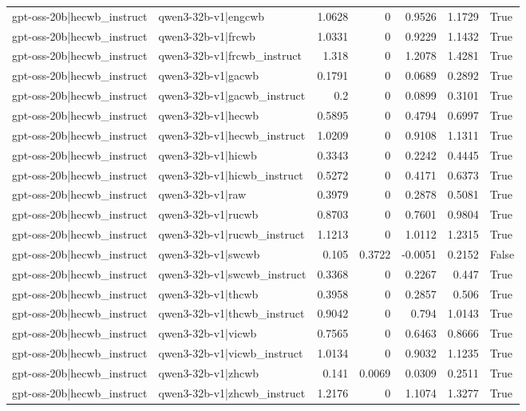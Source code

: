 \begin{table}
\begin{tabular}{l l r r r r l}
gpt-oss-20b|hecwb_instruct & qwen3-32b-v1|engcwb & 1.0628 & 0 & 0.9526 & 1.1729 & True \\
gpt-oss-20b|hecwb_instruct & qwen3-32b-v1|frcwb & 1.0331 & 0 & 0.9229 & 1.1432 & True \\
gpt-oss-20b|hecwb_instruct & qwen3-32b-v1|frcwb_instruct & 1.318 & 0 & 1.2078 & 1.4281 & True \\
gpt-oss-20b|hecwb_instruct & qwen3-32b-v1|gacwb & 0.1791 & 0 & 0.0689 & 0.2892 & True \\
gpt-oss-20b|hecwb_instruct & qwen3-32b-v1|gacwb_instruct & 0.2 & 0 & 0.0899 & 0.3101 & True \\
gpt-oss-20b|hecwb_instruct & qwen3-32b-v1|hecwb & 0.5895 & 0 & 0.4794 & 0.6997 & True \\
gpt-oss-20b|hecwb_instruct & qwen3-32b-v1|hecwb_instruct & 1.0209 & 0 & 0.9108 & 1.1311 & True \\
gpt-oss-20b|hecwb_instruct & qwen3-32b-v1|hicwb & 0.3343 & 0 & 0.2242 & 0.4445 & True \\
gpt-oss-20b|hecwb_instruct & qwen3-32b-v1|hicwb_instruct & 0.5272 & 0 & 0.4171 & 0.6373 & True \\
gpt-oss-20b|hecwb_instruct & qwen3-32b-v1|raw & 0.3979 & 0 & 0.2878 & 0.5081 & True \\
gpt-oss-20b|hecwb_instruct & qwen3-32b-v1|rucwb & 0.8703 & 0 & 0.7601 & 0.9804 & True \\
gpt-oss-20b|hecwb_instruct & qwen3-32b-v1|rucwb_instruct & 1.1213 & 0 & 1.0112 & 1.2315 & True \\
gpt-oss-20b|hecwb_instruct & qwen3-32b-v1|swcwb & 0.105 & 0.3722 & -0.0051 & 0.2152 & False \\
gpt-oss-20b|hecwb_instruct & qwen3-32b-v1|swcwb_instruct & 0.3368 & 0 & 0.2267 & 0.447 & True \\
gpt-oss-20b|hecwb_instruct & qwen3-32b-v1|thcwb & 0.3958 & 0 & 0.2857 & 0.506 & True \\
gpt-oss-20b|hecwb_instruct & qwen3-32b-v1|thcwb_instruct & 0.9042 & 0 & 0.794 & 1.0143 & True \\
gpt-oss-20b|hecwb_instruct & qwen3-32b-v1|vicwb & 0.7565 & 0 & 0.6463 & 0.8666 & True \\
gpt-oss-20b|hecwb_instruct & qwen3-32b-v1|vicwb_instruct & 1.0134 & 0 & 0.9032 & 1.1235 & True \\
gpt-oss-20b|hecwb_instruct & qwen3-32b-v1|zhcwb & 0.141 & 0.0069 & 0.0309 & 0.2511 & True \\
gpt-oss-20b|hecwb_instruct & qwen3-32b-v1|zhcwb_instruct & 1.2176 & 0 & 1.1074 & 1.3277 & True \\

\end{tabular}
\end{table}
